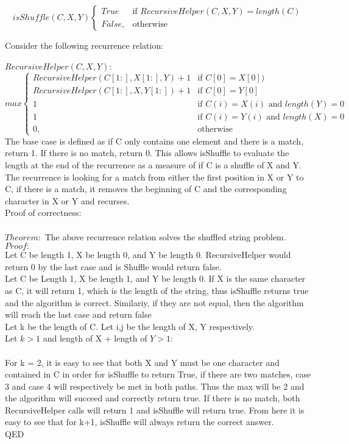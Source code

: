 \documentclass{article}
\begin{document}
\begin{enumerate}
$$
 isShuffle(C, X, Y) 
    \begin{cases}
    
    True & \text{if } RecursiveHelper(C,X,Y) = length(C) \\
    False, & \text{otherwise}
    \end{cases}
$$


Consider the following recurrence relation:


$RecursiveHelper(C, X, Y)$:\\
$$
    max  
    \begin{cases}
        RecursiveHelper(C[1:], X[1:], Y) + 1   & \text{if } C[0] = X[0])\\
        RecursiveHelper(C[1:], X, Y[1:]) + 1    & \text{if } C[0] = Y[0]\\
        1  & \text{if } C(i) = X(i) \text{ and } length(Y) = 0\\
        1  & \text{if } C(i) = Y(i) \text{ and } length(X) = 0\\
        0, & \text{otherwise}
    \end{cases}
$$
The base case is defined as if C only contains one element and there is a match, return 1. If there is no match, return 0. This allows isShuffle to evaluate the length at the end of the recurrence as a measure of if C is a shuffle of X and Y.
The recurrence is looking for a match from either the first position in X or Y to C, if there is a match, it removes the beginning of C and the corresponding character in X or Y and recurses. \\

Proof of correctness:\\
\\
$Theorem:$ The above recurrence relation solves the shuffled string problem. \\
$Proof:$ \\
Let C be length 1, X be length 0, and Y be length 0. RecursiveHelper would return 0 by the last case and is Shuffle would return false. \\
Let C be Length 1, X be length 1, and Y be length 0. If X is the same character as C, it will return 1, which is the length of the string, thus isShuffle returns true and the algorithm is correct. Similariy, if they are not equal, then the algorithm will reach the last case and return false\\
Let k be the length of C. Let i,j be the length of X, Y respectively. \\
Let $k > 1$ and length of X + length of $Y > 1$: \\
\\
For k = 2, it is easy to see that both X and Y must be one character and contained in C in order for isShuffle to return True, if there are two matches, case 3 and case 4 will respectively be met in both paths. Thus the max will be 2 and the algorithm will succeed and correctly return true. If there is no match, both RecursiveHelper calls will return 1 and isShuffle will return true. From here it is easy to see that for k+1, isShuffle will always return the correct answer.
\\
QED\\


\end{enumerate}
\end{document}
